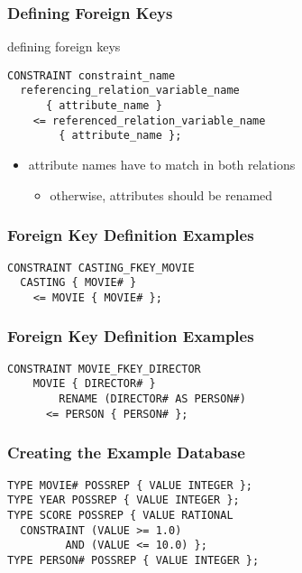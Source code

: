 \documentclass[dvipsnames]{beamer}
\theoremstyle{plain}
\begin{document}
\begin{frame}[fragile]
  \frametitle{Defining Foreign Keys}

  \begin{block}{defining foreign keys}
    \begin{lstlisting}
CONSTRAINT constraint_name
  referencing_relation_variable_name
      { attribute_name }
    <= referenced_relation_variable_name
        { attribute_name };
    \end{lstlisting}
  \end{block}

  \begin{itemize}
    \item attribute names have to match in both relations
    \begin{itemize}
      \item otherwise, attributes should be renamed
    \end{itemize}
  \end{itemize}
\end{frame}

\begin{frame}[fragile]
  \frametitle{Foreign Key Definition Examples}

  \begin{example}
    \begin{lstlisting}
CONSTRAINT CASTING_FKEY_MOVIE
  CASTING { MOVIE# }
    <= MOVIE { MOVIE# };
    \end{lstlisting}
  \end{example}
\end{frame}

\begin{frame}[fragile]
  \frametitle{Foreign Key Definition Examples}

  \begin{example}
    \begin{lstlisting}
CONSTRAINT MOVIE_FKEY_DIRECTOR
    MOVIE { DIRECTOR# }
        RENAME (DIRECTOR# AS PERSON#)
      <= PERSON { PERSON# };
    \end{lstlisting}
  \end{example}
\end{frame}

\begin{frame}[fragile]
  \frametitle{Creating the Example Database}

  \begin{example}
    \begin{lstlisting}
TYPE MOVIE# POSSREP { VALUE INTEGER };
TYPE YEAR POSSREP { VALUE INTEGER };
TYPE SCORE POSSREP { VALUE RATIONAL
  CONSTRAINT (VALUE >= 1.0)
         AND (VALUE <= 10.0) };
TYPE PERSON# POSSREP { VALUE INTEGER };
    \end{lstlisting}
  \end{example}
\end{frame}
\end{document}

